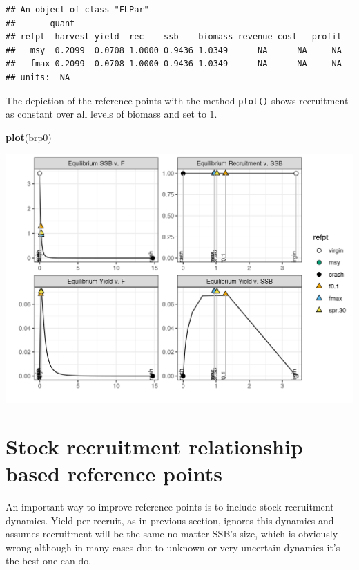 \documentclass[
]{book}
\newenvironment{Shaded}{\begin{snugshade}}{\end{snugshade}}
\newcommand{\FunctionTok}[1]{\textcolor[rgb]{0.13,0.29,0.53}{\textbf{#1}}}
\newcommand{\NormalTok}[1]{#1}
\begin{document}
\begin{verbatim}
## An object of class "FLPar"
##       quant
## refpt  harvest yield  rec    ssb    biomass revenue cost   profit
##   msy  0.2099  0.0708 1.0000 0.9436 1.0349      NA      NA     NA
##   fmax 0.2099  0.0708 1.0000 0.9436 1.0349      NA      NA     NA
## units:  NA
\end{verbatim}

The depiction of the reference points with the method \texttt{plot()} shows recruitment as constant over all levels of biomass and set to \(1\).

\begin{Shaded}
\begin{Highlighting}[]
\FunctionTok{plot}\NormalTok{(brp0)}
\end{Highlighting}
\end{Shaded}

\includegraphics{_bookdown_files/_main_files/figure-html/reference points-1.png}

\hypertarget{stock-recruitment-relationship-based-reference-points}{%
\section{Stock recruitment relationship based reference points}\label{stock-recruitment-relationship-based-reference-points}}

An important way to improve reference points is to include stock recruitment dynamics. Yield per recruit, as in previous section, ignores this dynamics and assumes recruitment will be the same no matter SSB's size, which is obviously wrong although in many cases due to unknown or very uncertain dynamics it's the best one can do.
\end{document}
